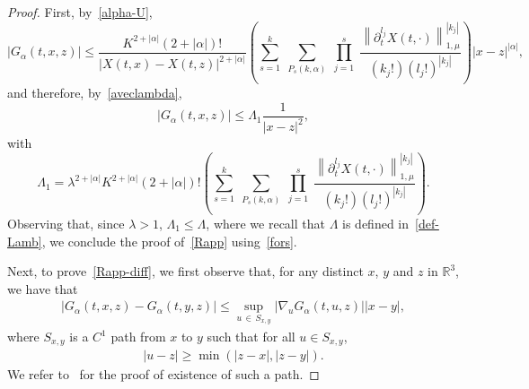 \documentclass[AHL,Unicode,longabstracts,published]{cedram}
\newcommand{\R}{\mathbb{R}}
\renewcommand{\leq}{\leqslant}
\renewcommand{\geq}{\geqslant}
\begin{document}
\begin{proof}
First, by~\eqref{alpha-U},
\[
|G_\alpha(t,x,z)|\leq \frac{K^{2+|\alpha|}(2+|\alpha|)!}{|X(t,x)-X(t,z)|^{2+|\alpha|}}\left(\underset{s=1}{\overset{k}{\sum}}\;\underset{P_s(k,\alpha)}{\sum}\;\underset{j=1}{\overset{s}{\prod}}\;\frac{\left\|\partial_t^{l_j}X(t,\cdot)\right\|_{1,\mu}^{\left|k_j\right|}}{\left(k_j!\right) \left(l_j!\right)^{\left|k_j\right|}}\right)|x-z|^{|\alpha|},
\]
and therefore, by~\eqref{aveclambda},
\begin{equation}\label{borne_G}
|G_\alpha(t,x,z)| \leq \Lambda_1 \frac{1}{|x-z|^2},
\end{equation}
with
\[
\Lambda_1= \lambda^{2+|\alpha|}K^{2+|\alpha|}(2+|\alpha|)!\left(\underset{s=1}{\overset{k}{\sum}}\;\underset{P_s(k,\alpha)}{\sum}\;\underset{j=1}{\overset{s}{\prod}}\;\frac{\left\|\partial_t^{l_j}X(t,\cdot) \right\|_{1,\mu}^{\left|k_j\right|}}{\left(k_j!\right) \left(l_j!\right)^{\left|k_j\right|}}\right).
\]
Observing that, since $\lambda>1$, $ \Lambda_1 \leq \Lambda$, where we recall that $\Lambda$ is defined in~\eqref{def-Lamb}, we conclude the proof of~\eqref{Rapp} using~\eqref{fors}.

Next, to prove~\eqref{Rapp-diff}, we first observe that, for any distinct $x$, $y$ and $z$ in $\R^3$, we have that
\begin{align}\label{app1}
|G_\alpha(t,x,z)-G_\alpha(t,y,z)| \leq \underset{u\,\in\,S_{x,y}}{\sup}|\nabla_u G_\alpha(t,u,z)| |x-y|,
\end{align}
where $S_{x,y}$ is a $C^1$ path from $x$ to $y$ such that for all $u \in S_{x,y}$,
\begin{align}\label{app2}
|u-z| \geq \min(|z-x|,|z-y|).
\end{align}
We refer to~\cite[Lemma~3.15]{Hofer} for the proof of existence of such a path.


\end{proof}
\end{document}
